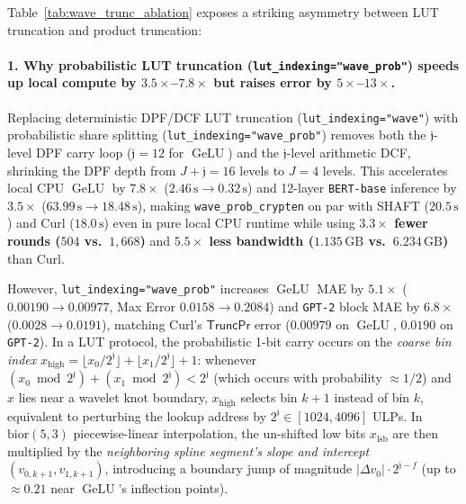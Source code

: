 \documentclass[11pt]{article}
\begin{document}
Table~\ref{tab:wave_trunc_ablation} exposes a striking asymmetry between LUT truncation and product truncation:

\paragraph{1. Why probabilistic LUT truncation (\texttt{lut\_indexing="wave\_prob"}) speeds up local compute by $3.5\times$--$7.8\times$ but raises error by $5\times$--$13\times$.}
Replacing deterministic DPF/DCF LUT truncation (\texttt{lut\_indexing="wave"}) with probabilistic share splitting (\texttt{lut\_indexing="wave\_prob"}) removes both the $\mathfrak{j}$-level DPF carry loop ($\mathfrak{j}=12$ for $\operatorname{GeLU}$) and the $\mathfrak{j}$-level arithmetic DCF, shrinking the DPF depth from $J + \mathfrak{j} = 16$ levels to $J = 4$ levels. This accelerates local CPU $\operatorname{GeLU}$ by \textbf{$7.8\times$} ($2.46\,\text{s} \to 0.32\,\text{s}$) and 12-layer \texttt{BERT-base} inference by \textbf{$3.5\times$} ($63.99\,\text{s} \to 18.48\,\text{s}$), making \texttt{wave\_prob\_crypten} on par with SHAFT ($20.5\,\text{s}$) and Curl ($18.0\,\text{s}$) even in pure local CPU runtime while using \textbf{$3.3\times$ fewer rounds ($504$ vs.\ $1,668$)} and \textbf{$5.5\times$ less bandwidth ($1.135\,\text{GB}$ vs.\ $6.234\,\text{GB}$)} than Curl.

However, \texttt{lut\_indexing="wave\_prob"} increases $\operatorname{GeLU}$ MAE by $5.1\times$ ($0.00190 \to 0.00977$, Max Error $0.0158 \to 0.2084$) and \texttt{GPT-2} block MAE by $6.8\times$ ($0.0028 \to 0.0191$), matching Curl's $\mathsf{TruncPr}$ error ($0.00979$ on $\operatorname{GeLU}$, $0.0190$ on \texttt{GPT-2}). In a LUT protocol, the probabilistic 1-bit carry occurs on the \emph{coarse bin index} $x_{\text{high}} = \lfloor x_0 / 2^{\mathfrak{j}} \rfloor + \lfloor x_1 / 2^{\mathfrak{j}} \rfloor + 1$: whenever $(x_0 \bmod 2^{\mathfrak{j}}) + (x_1 \bmod 2^{\mathfrak{j}}) < 2^{\mathfrak{j}}$ (which occurs with probability $\approx 1/2$) and $x$ lies near a wavelet knot boundary, $x_{\text{high}}$ selects bin $k+1$ instead of bin $k$, equivalent to perturbing the lookup address by $2^{\mathfrak{j}} \in [1024, 4096]$ ULPs. In $\text{bior}(5,3)$ piecewise-linear interpolation, the un-shifted low bits $x_{\text{lsb}}$ are then multiplied by the \emph{neighboring spline segment's slope and intercept} $(v_{0,k+1}, v_{1,k+1})$, introducing a boundary jump of magnitude $|\Delta v_0| \cdot 2^{\mathfrak{j}-f}$ (up to $\approx 0.21$ near $\operatorname{GeLU}$'s inflection points).
\end{document}
